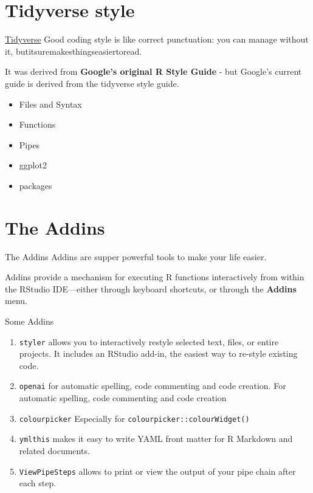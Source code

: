 \documentclass[
  ignorenonframetext,
]{beamer}
\begin{document}
\section{Tidyverse style}\label{tidyverse-style}

\begin{frame}{\href{https://style.tidyverse.org/index.html}{Tidyverse}}
\label{tidyverse}
Good coding style is like correct punctuation: you can manage without
it, butitsuremakesthingseasiertoread.

It was derived from \textbf{Google's original R Style Guide} - but
Google's current guide is derived from the tidyverse style guide.

\begin{itemize}
\item
  Files and Syntax
\item
  Functions
\item
  Pipes
\item
  ggplot2
\item
  packages
\end{itemize}
\end{frame}

\section{The Addins}\label{the-addins}

\begin{frame}{The Addins}
Addins are supper powerful tools to make your life easier.

Addins provide a mechanism for executing R functions interactively from
within the RStudio IDE---either through keyboard shortcuts, or through
the \textbf{Addins} menu.
\end{frame}

\begin{frame}[fragile]{Some Addins}
\label{some-addins}
\begin{enumerate}
\item
  \texttt{styler} allows you to interactively restyle selected text,
  files, or entire projects. It includes an RStudio add-in, the easiest
  way to re-style existing code.
\item
  \texttt{openai} for automatic spelling, code commenting and code
  creation. For automatic spelling, code commenting and code creation
\item
  \texttt{colourpicker} Especially for
  \texttt{colourpicker::colourWidget()}
\item
  \texttt{ymlthis} makes it easy to write YAML front matter for R
  Markdown and related documents.
\item
  \texttt{ViewPipeSteps} allows to print or view the output of your pipe
  chain after each step.
\end{enumerate}
\end{frame}
\end{document}
